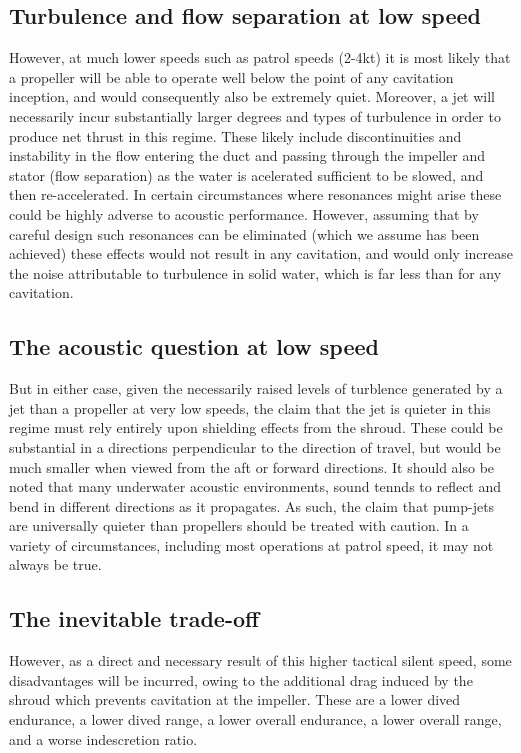 \documentclass{article}\usepackage[]{graphicx}\usepackage[]{color}
\begin{document}
\subsection{Turbulence and flow separation at low speed}

However, at much lower speeds such as patrol speeds (2-4kt) it is most likely that a propeller will be able to operate well below the point of any cavitation inception, and would consequently also be extremely quiet.  Moreover, a jet will necessarily incur substantially larger degrees and types of turbulence in order to produce net thrust in this regime.  These likely include discontinuities and instability in the flow entering the duct and passing through the impeller and stator (flow separation) as the water is acelerated sufficient to be slowed, and then re-accelerated.  In certain circumstances where resonances might arise these could be highly adverse to acoustic performance.  However, assuming that by careful design such resonances can be eliminated (which we assume has been achieved) these effects would not result in any cavitation, and would only increase the noise attributable to turbulence in solid water, which is far less than for any cavitation.

\subsection{The acoustic question at low speed}

But in either case, given the necessarily raised levels of turblence generated by a jet than a propeller at very low speeds, the claim that the jet is quieter in this regime must rely entirely upon shielding effects from the shroud.  These could be substantial in a directions perpendicular to the direction of travel, but would be much smaller when viewed from the aft or forward directions.  It should also be noted that many underwater acoustic environments, sound tennds to reflect and bend in different directions as it propagates. As such, the claim that pump-jets are universally quieter than propellers should be treated with caution.  In a variety of circumstances, including most operations at patrol speed, it may not always be true.

\subsection{The inevitable trade-off}

However, as a direct and necessary result of this higher tactical silent speed, some disadvantages will be incurred, owing to the additional drag induced by the shroud which prevents cavitation at the impeller.  These are a lower dived endurance, a lower dived range, a lower overall endurance, a lower overall range, and a worse indescretion ratio.
\end{document}

